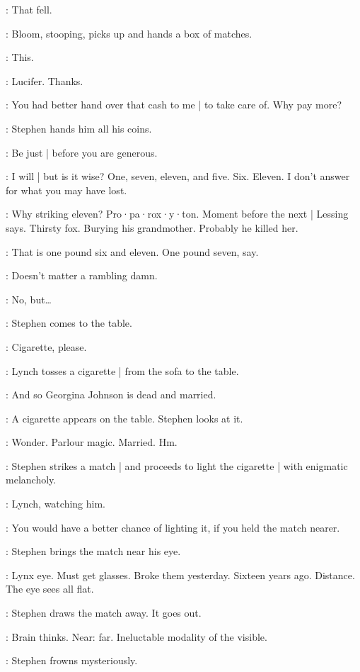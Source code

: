 \Stephen:
That fell.

:
Bloom,
stooping,
picks up and hands a box of matches.

\Bloom:
This.

\Stephen:
Lucifer.
Thanks.

\Bloom:
You had better hand over that cash to me |
to take care of.
Why pay more?

:
Stephen hands him all his coins.

\Stephen:
Be just |
before you are generous.

\Bloom:
I will |
but is it wise?
One,
seven,
eleven,
and five.
Six.
Eleven.
I don't answer for what you may have lost.

\Stephen:
Why striking eleven?
Pro·pa·rox·y·ton.
Moment before the next |
Lessing says.
Thirsty fox.
Burying his grandmother.
Probably he killed her.

\Bloom:
That is one pound six and eleven.
One pound seven,
say.

\Stephen:
Doesn't matter a rambling damn.

\Bloom:
No,
but…

:
Stephen comes to the table.

\Stephen:
Cigarette,
please.

:
Lynch tosses a cigarette |
from the sofa to the table.

\Stephen:
And so Georgina Johnson is dead and married.

:
A cigarette appears on the table.
Stephen looks at it.

\Stephen:
Wonder.
Parlour magic.
Married.
Hm.

:
Stephen strikes a match |
and proceeds to light the cigarette |
with enigmatic melancholy.

:
Lynch,
watching him.

\Lynch:
You would have a better chance of lighting it,
if you held the match nearer.

:
Stephen brings the match near his eye.

\Stephen:
Lynx eye.
Must get glasses.
Broke them yesterday.
Sixteen years ago.
Distance.
The eye sees all flat.

:
Stephen draws the match away.
It goes out.

\Stephen:
Brain thinks.
Near:
far.
Ineluctable modality of the visible.

:
Stephen frowns mysteriously.

